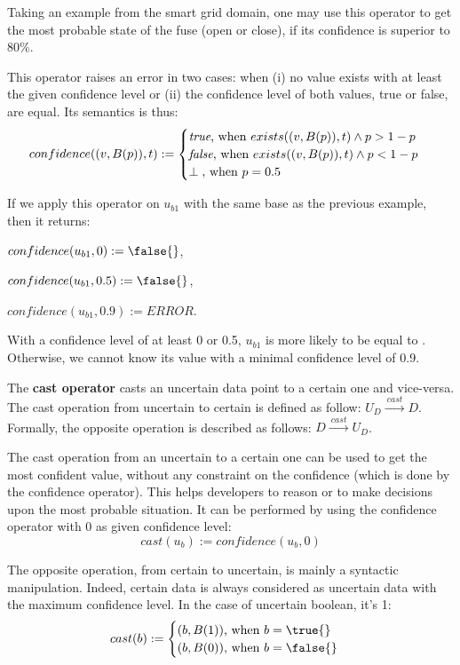 Taking an example from the smart grid domain, one may use this operator to get the most probable state of the fuse (open or close), if its confidence is superior to 80\%.

This operator raises an error in two cases: when (i) no value exists with at least the given confidence level or (ii) the confidence level of both values, true or false, are equal.
Its semantics is thus:
$$confidence((v, B(p)), t) := \begin{cases}
												\text{\textit{true}, when } exists((v, B(p)), t) \land p >  1-p \\
												\text{\textit{false}, when } exists((v, B(p)), t) \land p < 1-p \\
												\perp \text{, when } p = 0.5
											\end{cases}$$
												
If we apply this operator on $u_{b1}$ with the same base as the previous example, then it returns:
\begin{itemize*}
	\item[] $confidence(u_{b1}, 0) := \false{}$,
	\item[] $confidence(u_{b1}, 0.5) := \false{}$,
	\item[] $confidence(u_{b1}, 0.9) := ERROR$.
\end{itemize*}
With a confidence level of at least 0 or 0.5, $u_{b1}$ is more likely to be equal to \false{}.
Otherwise, we cannot know its value with a minimal confidence level of 0.9.

\begin{operator}
	\label{op:cast}
	The \textbf{cast operator} casts an uncertain data point to a certain one and vice-versa. 
	The cast operation from uncertain to certain is defined as follow: $U_D \xrightarrow{~cast~} D$.
	Formally, the opposite operation is described as follows: $D \xrightarrow{~cast~} U_D$.
\end{operator}

The cast operation from an uncertain to a certain one can be used to get the most confident value, without any constraint on the confidence (which is done by the confidence operator).
This helps developers to reason or to make decisions upon the most probable situation.
It can be performed by using the confidence operator with 0 as given confidence level:
$$cast(u_b) := confidence(u_b, 0)$$

The opposite operation, from certain to uncertain, is mainly a syntactic manipulation.
Indeed, certain data is always considered as uncertain data with the maximum confidence level.
In the case of uncertain boolean, it's 1:
$$cast(b) := \begin{cases}
                        (b, B(1)) \text{, when } b = \true{}\\
                        (b, B(0)) \text{, when } b = \false{}
                    \end{cases}$$
  
